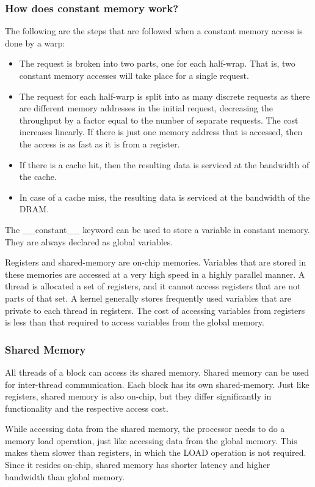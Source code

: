 \documentclass[../notes.tex]{subfiles}
\begin{document}
\subsubsection{How does constant memory work?}
The following are the steps that are followed when a constant memory access is done by a warp:

\begin{itemize}
\item The request is broken into two parts, one for each half-wrap. That is, two constant memory accesses will take place for a single request.
\item The request for each half-warp is split into as many discrete requests as there are different memory addresses in the initial request, decreasing the throughput by a factor equal to the number of separate requests. The cost increases linearly. If there is just one memory address that is accessed, then the access is as fast as it is from a register.
\item If there is a cache hit, then the resulting data is serviced at the bandwidth of the cache.
\item In case of a cache miss, the resulting data is serviced at the bandwidth of the DRAM.
\end{itemize}

The \_\_constant\_\_ keyword can be used to store a variable in constant memory. They are always declared as global variables.

Registers and shared-memory are on-chip memories. Variables that are stored in these memories are accessed at a very high speed in a highly parallel manner. A thread is allocated a set of registers, and it cannot access registers that are not parts of that set. A kernel generally stores frequently used variables that are private to each thread in registers. The cost of accessing variables from registers is less than that required to access variables from the global memory.

\subsubsection{Shared Memory}
All threads of a block can access its shared memory. Shared memory can be used for inter-thread communication. Each block has its own shared-memory. Just like registers, shared memory is also on-chip, but they differ significantly in functionality and the respective access cost.

While accessing data from the shared memory, the processor needs to do a memory load operation, just like accessing data from the global memory. This makes them slower than registers, in which the LOAD operation is not required. Since it resides on-chip, shared memory has shorter latency and higher bandwidth than global memory.
\end{document}
